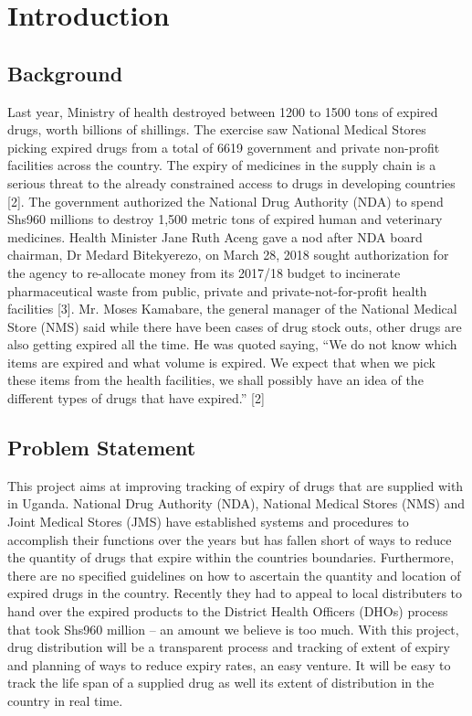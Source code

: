 \documentclass[12pt, a4paper]{report}
\begin{document}

%

 \chapter{Introduction}


\section{Background}

Last year, Ministry of health destroyed between 1200 to 1500 tons of expired drugs, worth billions of shillings. The exercise saw National Medical Stores picking expired drugs from a total of 6619 government and private non-profit facilities across the country. The expiry of medicines in the supply chain is a serious threat to the already constrained access to drugs in developing countries [2]. The government authorized the National Drug Authority (NDA) to spend Shs960 millions to destroy 1,500 metric tons of expired human and veterinary medicines. Health Minister Jane Ruth Aceng gave a nod after NDA board chairman, Dr Medard Bitekyerezo, on March 28, 2018 sought authorization for the agency to re-allocate money from its 2017/18 budget to incinerate pharmaceutical waste from public, private and private-not-for-profit health facilities [3]. Mr. Moses Kamabare, the general manager of the National Medical Store (NMS) said while there have been cases of drug stock outs, other drugs are also getting expired all the time. He was quoted saying, “We do not know which items are expired and what volume is expired. We expect that when we pick these items from the health facilities, we shall possibly have an idea of the different types of drugs that have expired.” [2] 


\section{Problem Statement}
This project aims at improving tracking of expiry of drugs that are supplied with in Uganda. National Drug Authority (NDA), National Medical Stores (NMS) and Joint Medical Stores (JMS) have established systems and procedures to accomplish their functions over the years but has fallen short of ways to reduce the quantity of drugs that expire within the countries boundaries. Furthermore, there are no specified guidelines on how to ascertain the quantity and location of expired drugs in the country. Recently they had to appeal to local distributers to hand over the expired products to the District Health Officers (DHOs) process that took Shs960 million – an amount we believe is too much. With this project, drug distribution will be a transparent process and tracking of extent of expiry and planning of ways to reduce expiry rates, an easy venture. It will be easy to track the life span of a supplied drug as well its extent of distribution in the country in real time. 
\end{document}
